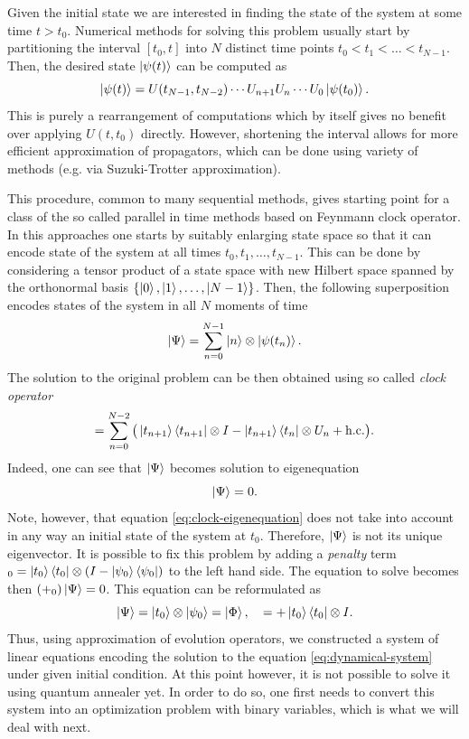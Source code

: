 Given the initial state we are interested in finding the state of the
system at some time $t > t_0$. Numerical methods for solving this problem
usually start by partitioning the interval $[t_0, t]$ into $N$ distinct time
points $t_0 < t_1 < \ldots < t_{N-1}$. Then, the desired state $\ket{\psi(t)}$
can be computed as 
\begin{equation}
\ket{\psi(t)} = U(t_{N-1}, t_{N-2}) \cdots U_{n+1}U_n \cdots U_0 \ket{\psi(t_0)}.
\end{equation}
This is purely a rearrangement of computations which by itself gives no benefit
over applying $U(t, t_0)$ directly. However, shortening the interval allows for more efficient approximation of propagators, which can be done using variety of methods (e.g. via Suzuki-Trotter approximation). 

This procedure, common to many sequential methods, gives starting point for a class of the so called parallel in time methods based on Feynmann clock operator. In this approaches one starts by suitably enlarging state space so that it can encode
state of the system at all times $t_0, t_1, \ldots, t_{N-1}$. This can be done
by considering a tensor product of a state space with new Hilbert space
spanned by the orthonormal basis $\{\ket{0}, \ket{1}, \ldots, \ket{N-1}\}$. Then, the following superposition encodes states of the system in all $N$ moments of time
\begin{equation}
    \ket{\Psi} = \sum_{n=0}^{N-1} \ket{n} \otimes \ket{\psi(t_n)}.
\end{equation}
The solution to the original problem can be then obtained using so called \emph{clock operator}
\begin{equation}
\label{eq:clock2}
 \clockop
   = 
\sum_{n=0}^{N-2}
\big( 
\ket{t_{n+1}}\bra{t_{n+1}} \otimes I - \ket{t_{n+1}}\bra{t_n} \otimes U_n
+ \text{h.c.}
\big).
\end{equation}
Indeed, one can see that $\ket{\Psi}$ becomes solution to eigenequation
\begin{equation}
\label{eq:clock-eigenequation}
\clockop \ket{\Psi} = 0.
\end{equation}
Note, however, that equation \eqref{eq:clock-eigenequation} does not take into account in any way an initial state of the system at $t_0$. Therefore, $\ket{\Psi}$ is not its unique eigenvector. It is possible to fix this problem by adding a \emph{penalty} term $\clockop_0 = \ket{t_0}\bra{t_0}\otimes(I-\ket{\psi_0}\bra{\psi_0})$ to the left hand side. The equation to solve becomes then $(\clockop + \clockop_0) \ket{\Psi} = 0$.
This equation can be reformulated as
\begin{equation}
\label{eq:gsys}
\coefmatrix \ket{\Psi} 
=
\ket{t_0}\otimes \ket{\psi_0} = \ket{\Phi},
\quad 
\coefmatrix=\clockop + \ket{t_0}\bra{t_0} \otimes I.
\end{equation}
Thus, using approximation of evolution operators, we constructed a system of linear equations encoding the solution to the equation \eqref{eq:dynamical-system} under given initial condition. At this point however, it is not possible to solve it using quantum annealer yet. In order
to do so, one first needs to convert this system into an optimization problem
with binary variables, which is what we will deal with next.
